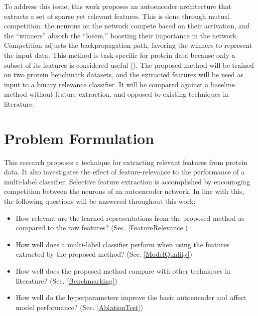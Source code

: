 \par To address this issue, this work proposes an autoencoder architecture that
extracts a set of sparse yet relevant features. This is done through mutual
competition: the neurons on the network compete based on their activation, and
the ``winners'' absorb the ``losers,'' boosting their importance in the network.
Competition adjusts the backpropagation path, favoring the winners to represent
the input data. This method is task-specific for protein data because only a subset
of its features is considered useful (\cite{iqbal2014efficient, gaudet2017gene}).
The proposed method will be trained on two protein benchmark datasets, and the
extracted features will be used as input to a binary relevance classifier. It will
be compared against a baseline method without feature extraction, and opposed to
existing techniques in literature.

\section{Problem Formulation}
\label{Problem}

\par This research proposes a technique for extracting relevant features from
protein data. It also investigates the effect of feature-relevance to the
performance of a multi-label classifier. Selective feature extraction is
accomplished by encouraging competition between the neurons of an
autoencoder network. In line with this, the following questions will be
answered throughout this work:

\begin{itemize}
    \item How relevant are the learned representations from the proposed method
        as compared to the raw features? (Sec. \ref{FeatureRelevance})
    \item How well does a multi-label classifier perform when using the
        features extracted by the proposed method? (Sec. \ref{ModelQuality})
    \item How well does the proposed method compare with other techniques in
        literature? (Sec. \ref{Benchmarking})
    \item How well do the hyperparameters improve the basic autoencoder and
        affect model performance? (Sec. \ref{AblationTest})
\end{itemize}


